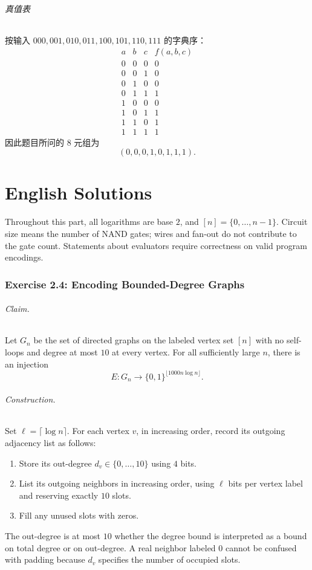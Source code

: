 \documentclass[UTF8,fontset=fandol,11pt,a4paper]{ctexart}
\newcommand{\bits}{\{0,1\}}
\begin{document}
\paragraph{真值表}
按输入 $000,001,010,011,100,101,110,111$ 的字典序：
\[
\begin{array}{ccc|c}
 a&b&c&f(a,b,c)\\
\hline
 0&0&0&0\\
 0&0&1&0\\
 0&1&0&0\\
 0&1&1&1\\
 1&0&0&0\\
 1&0&1&1\\
 1&1&0&1\\
 1&1&1&1
\end{array}
\]
因此题目所问的 $8$ 元组为
\[
 \boxed{(0,0,0,1,0,1,1,1).}
\]

\clearpage
{}
{}
\part*{English Solutions}

\noindent
Throughout this part, all logarithms are base $2$, and
$[n]=\{0,\ldots,n-1\}$. Circuit size means the number of NAND gates;
wires and fan-out do not contribute to the gate count. Statements about
evaluators require correctness on valid program encodings.

\section{Exercise 2.4: Encoding Bounded-Degree Graphs}

\paragraph{Claim.}
Let $G_n$ be the set of directed graphs on the labeled vertex set $[n]$
with no self-loops and degree at most $10$ at every vertex.
For all sufficiently large $n$, there is an injection
\[
 E:G_n\longrightarrow\bits^{\lfloor1000n\log n\rfloor}.
\]

\paragraph{Construction.}
Set $\ell=\lceil\log n\rceil$. For each vertex $v$, in increasing order,
record its outgoing adjacency list as follows:
\begin{enumerate}
 \item Store its out-degree $d_v\in\{0,\ldots,10\}$ using $4$ bits.
 \item List its outgoing neighbors in increasing order, using $\ell$ bits
       per vertex label and reserving exactly $10$ slots.
 \item Fill any unused slots with zeros.
\end{enumerate}
The out-degree is at most $10$ whether the degree bound is interpreted
as a bound on total degree or on out-degree. A real neighbor labeled $0$
cannot be confused with padding because $d_v$ specifies the number of
occupied slots.
\end{document}
